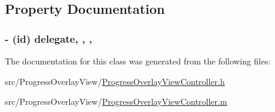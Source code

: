 \subsection{Property Documentation}
\hypertarget{interface_progress_overlay_view_controller_a8d9332fcd23523b1e2520b8765577423}{
\subsubsection[{delegate}]{\setlength{\rightskip}{0pt plus 5cm}-\/ (id) delegate\hspace{0.3cm}{\ttfamily [read]}, {\ttfamily [write]}, {\ttfamily [atomic]}, {\ttfamily [assign]}}}\label{interface_progress_overlay_view_controller_a8d9332fcd23523b1e2520b8765577423}


The documentation for this class was generated from the following files\-:\begin{DoxyCompactItemize}
\item 
src/\-Progress\-Overlay\-View/\hyperlink{_progress_overlay_view_controller_8h}{Progress\-Overlay\-View\-Controller.\-h}\item 
src/\-Progress\-Overlay\-View/\hyperlink{_progress_overlay_view_controller_8m}{Progress\-Overlay\-View\-Controller.\-m}\end{DoxyCompactItemize}
